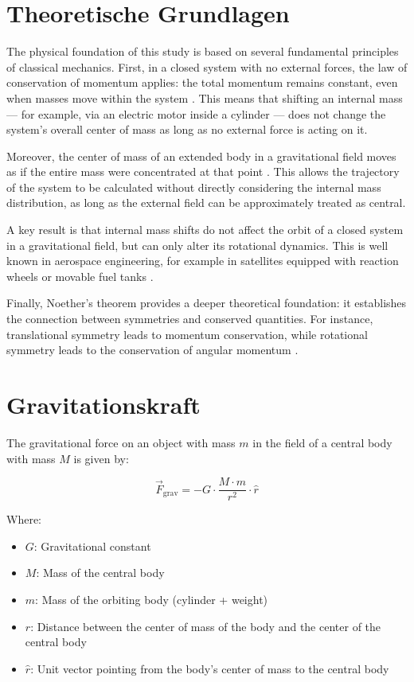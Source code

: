 \documentclass[conference]{IEEEtran}
\begin{document}
\section{Theoretische Grundlagen}

The physical foundation of this study is based on several fundamental principles of classical mechanics. First, in a closed system with no external forces, the law of conservation of momentum applies: the total momentum remains constant, even when masses move within the system \cite{goldstein}. This means that shifting an internal mass — for example, via an electric motor inside a cylinder — does not change the system’s overall center of mass as long as no external force is acting on it.

Moreover, the center of mass of an extended body in a gravitational field moves as if the entire mass were concentrated at that point \cite{taylor, landau}. This allows the trajectory of the system to be calculated without directly considering the internal mass distribution, as long as the external field can be approximately treated as central.

A key result is that internal mass shifts do not affect the orbit of a closed system in a gravitational field, but can only alter its rotational dynamics. This is well known in aerospace engineering, for example in satellites equipped with reaction wheels or movable fuel tanks \cite{marion}.

Finally, Noether’s theorem provides a deeper theoretical foundation: it establishes the connection between symmetries and conserved quantities. For instance, translational symmetry leads to momentum conservation, while rotational symmetry leads to the conservation of angular momentum \cite{noether}.




\section{Gravitationskraft}

The gravitational force on an object with mass \( m \) in the field of a central body with mass \( M \) is given by:

\[
\vec{F}_\text{grav} = -G \cdot \frac{M \cdot m}{r^2} \cdot \hat{r}
\]

Where:
\begin{itemize}
  \item \( G \): Gravitational constant
  \item \( M \): Mass of the central body
  \item \( m \): Mass of the orbiting body (cylinder + weight)
  \item \( r \): Distance between the center of mass of the body and the center of the central body
  \item \( \hat{r} \): Unit vector pointing from the body’s center of mass to the central body
\end{itemize}
\end{document}
